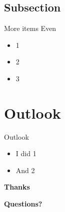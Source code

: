 \documentclass[aspectratio=169,xcolor=dvipsnames]{beamer}
\begin{document}
\subsection{Subsection}

\begin{frame}{More items}
    Even
    \begin{itemize}
        \item 1
        \item 2
        \item 3
    \end{itemize}
\end{frame}

\section{Outlook}

\begin{frame}{Outlook}
    \begin{itemize}
        \item I did 1
        \item And 2
    \end{itemize}
\end{frame}



\begin{frame}
    \Huge{\centerline{\textbf{Thanks}}}
\end{frame}

\begin{frame}
    \Huge{\centerline{\textbf{Questions?}}}
\end{frame}
\end{document}
